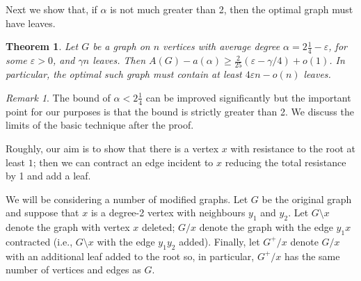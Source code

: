 \documentclass[11pt]{article}
\newtheorem{theorem}{Theorem}
\theoremstyle{remark}
\newtheorem*{remark}{Remark}
\def\a{\alpha}
\def\eps{\varepsilon}
\begin{document}
\medskip



Next we show that, if $\a$ is not much greater than 2, then
the optimal graph must have leaves. 

\begin{theorem}\label{leaves:thm-better}
  Let $G$ be a graph on $n$ vertices with average degree
  $\alpha=2\frac14-\eps$, for some $\eps>0$, and $\gamma n$ leaves.
  Then $A(G)-a(\a)\ge \frac{2}{25}(\eps-\gamma/4)+o(1)$.  In
  particular, the optimal such graph must contain at least $4\eps
  n-o(n)$ leaves.
\end{theorem}
\begin{remark}
  The bound of $\a<2\frac14$ can be improved significantly but the
  important point for our purposes is that the bound is strictly
  greater than 2.  We discuss the limits of the basic technique after
  the proof.
\end{remark}


Roughly, our aim is to show that there is a vertex $x$ with resistance
to the root at least $1$; then we can contract an edge incident to $x$
reducing the total resistance by 1 and add a leaf.

We will be considering a number of modified graphs. Let $G$ be the
original graph and suppose that $x$ is a degree-2 vertex with
neighbours $y_1$ and $y_2$. Let $G\setminus x$ denote the graph with
vertex $x$ deleted; $G/x$ denote the graph with the edge $y_1x$
contracted (i.e., $G\setminus x$ with the edge $y_1y_2$
added). Finally, let $G^+/x$ denote $G/x$ with an additional leaf
added to the root so, in particular, $G^+/x$ has the same number of
vertices and edges as $G$. 
\end{document}
